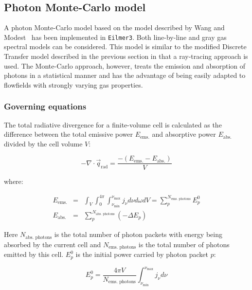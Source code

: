 

\subsection{Photon Monte-Carlo model}
\label{sec:photon_monte_carlo}

A photon Monte-Carlo model based on the model described by Wang and Modest~\cite{WM2007} has been implemented in \texttt{Eilmer3}.
Both line-by-line and gray gas spectral models can be considered.
This model is similar to the modified Discrete Transfer model described in the previous section in that a ray-tracing approach is used.
The Monte-Carlo approach, however, treats the emission and absorption of photons in a statistical manner and has the advantage of being easily adapted to flowfields with strongly varying gas properties.

\subsubsection{Governing equations}

The total radiative divergence for a finite-volume cell is calculated as the difference between the total emissive power $E_{\text{ems.}}$ and absorptive power $E_{\text{abs.}}$ divided by the cell volume $V$:

\begin{equation}
 - \nabla \cdot \vec{q}_\text{rad} = \frac{ - \left ( E_{\text{ems.}} - E_{\text{abs.}} \right ) }{V}
 \label{eq:my_divq}
\end{equation}

\noindent where:

\begin{eqnarray}
 E_{\text{ems.}} &=& \int_{V} \int_{0}^{{4\pi}} \int_{\nu_{\text{min}}}^{\nu_{\text{max}}} j_{\nu} d\nu d\omega dV = \sum_{p}^{N_{\text{ems. photons}}} E_{p}^0 \label{eq:E_emission} \\
 E_{\text{abs.}} &=& \sum_{p}^{N_{\text{abs. photons}}} \left ( - \Delta E_{p} \right ) \label{eq:E_absorption} 
\end{eqnarray}

\noindent Here $N_{\text{abs. photons}}$ is the total number of photon packets with energy being absorbed by the current cell and $N_{\text{ems. photons}}$ is the total number of photons emitted by this cell.
$E_{p}^0$ is the initial power carried by photon packet $p$:

\begin{equation}
 E_{p}^0 = \frac{ 4 \pi V  }{ N_{\text{ems. photons} } } \int_{\nu_{\text{min}}}^{\nu_{\text{max}}} j_{\nu} d \nu
\end{equation}

